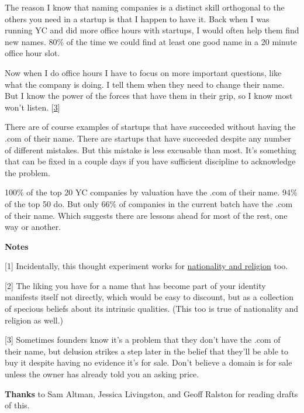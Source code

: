 The reason I know that naming companies is a distinct skill orthogonal
to the others you need in a startup is that I happen to have it. Back
when I was running YC and did more office hours with startups, I would
often help them find new names. 80\% of the time we could find at least
one good name in a 20 minute office hour slot.

Now when I do office hours I have to focus on more important questions,
like what the company is doing. I tell them when they need to change
their name. But I know the power of the forces that have them in their
grip, so I know most won't listen. {[}\hyperref[f1n]{3}{]}

There are of course examples of startups that have succeeded without
having the .com of their name. There are startups that have succeeded
despite any number of different mistakes. But this mistake is less
excusable than most. It's something that can be fixed in a couple days
if you have sufficient discipline to acknowledge the problem.

100\% of the top 20 YC companies by valuation have the .com of their
name. 94\% of the top 50 do. But only 66\% of companies in the current
batch have the .com of their name. Which suggests there are lessons
ahead for most of the rest, one way or another.

\textbf{Notes}

{[}1{]} Incidentally, this thought experiment works for
\href{identity.html}{nationality and religion} too.

{[}2{]} The liking you have for a name that has become part of your
identity manifests itself not directly, which would be easy to discount,
but as a collection of specious beliefs about its intrinsic qualities.
(This too is true of nationality and religion as well.)

{[}3{]} Sometimes founders know it's a problem that they don't have the
.com of their name, but delusion strikes a step later in the belief that
they'll be able to buy it despite having no evidence it's for sale.
Don't believe a domain is for sale unless the owner has already told you
an asking price.

\textbf{Thanks} to Sam Altman, Jessica Livingston, and Geoff Ralston for
reading drafts of this.
